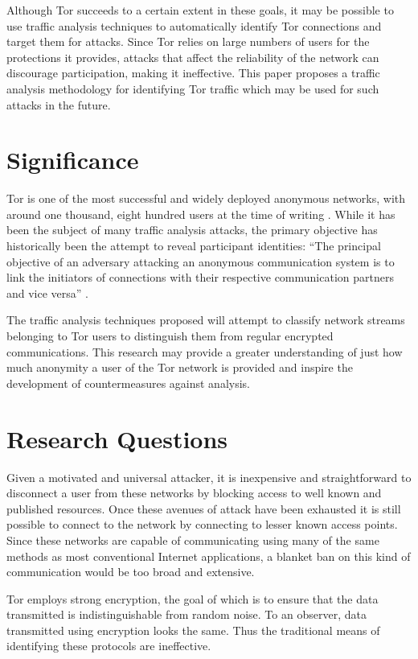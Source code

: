 \documentclass{ecuthesis}
\begin{document}
Although Tor succeeds to a certain extent in these goals, it may be possible to
use traffic analysis techniques to automatically identify Tor connections and
target them for attacks. Since Tor relies on large numbers of users for the
protections it provides, attacks that affect the reliability of the network can
discourage participation, making it ineffective. This paper proposes a traffic
analysis methodology for identifying Tor traffic which may be used for such
attacks in the future.

\section{Significance}

Tor is one of the most successful and widely deployed anonymous networks, with
around one thousand, eight hundred users at the time of writing
\parencite{website:tor-anonymity-online}. While it has been the subject of many
traffic analysis attacks, the primary objective has historically been the
attempt to reveal participant identities: ``The principal objective of an
adversary attacking an anonymous communication system is to link the initiators
of connections with their respective communication partners and vice versa''
\parencite[page 3]{Murdoch:2005p325}.

The traffic analysis techniques proposed will attempt to classify network
streams belonging to Tor users to distinguish them from regular encrypted
communications. This research may provide a greater understanding of just
how much anonymity a user of the Tor network is provided and inspire
the development of countermeasures against analysis.

\section{Research Questions}

Given a motivated and universal attacker, it is inexpensive and straightforward
to disconnect a user from these networks by blocking access to well known and
published resources. Once these avenues of attack have been exhausted it is
still possible to connect to the network by connecting to lesser known access
points. Since these networks are capable of communicating using many of the
same methods as most conventional Internet applications, a blanket ban on this
kind of communication would be too broad and extensive.

Tor employs strong encryption, the goal of which is to ensure that the data
transmitted is indistinguishable from random noise. To an observer, data
transmitted using encryption looks the same. Thus the traditional means of
identifying these protocols are ineffective.
\end{document}
